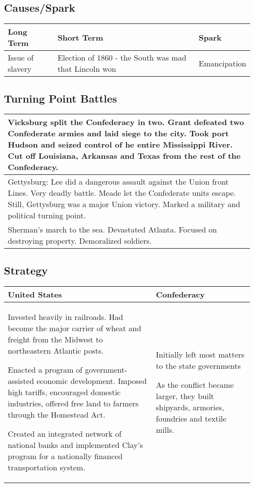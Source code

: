 \documentclass{article}
\begin{document}
\subsection{Causes/Spark}
\begin{tabular}{|p{4cm}|p{4cm}|p{4cm}|}
    \hline
    Long Term & Short Term & Spark \\
    \hline
    Issue of slavery
    &
    Election of 1860 - the South was mad that Lincoln won
    &
    Emancipation
    \\
    \hline
\end{tabular}

\subsection{Turning Point Battles}
\begin{tabular}{|p{14cm}|}
    \hline
    Vicksburg split the Confederacy in two. Grant defeated two Confederate
    armies and laid siege to the city. Took port Hudson and seized control of
    he entire Mississippi River. Cut off Louisiana, Arkansas and Texas from
    the rest of the Confederacy.
    \\
    \hline
    Gettysburg: Lee did a dangerous assault against the Union front Lines. Very
    deadly battle. Meade let the Confederate units escape. Still, Gettysburg
    was a major Union victory. Marked a military and political turning point.
    \\
    \hline
    Sherman's march to the sea. Devastated Atlanta. Focused on destroying
    property. Demoralized soldiers.
    \\
    \hline
\end{tabular}

\subsection{Strategy}
\begin{tabular}{|p{7cm}|p{7cm}|}
    \hline
    United States & Confederacy \\
    \hline
    Invested heavily in railroads. Had become the major carrier of wheat and
    freight from the Midwest to northeastern Atlantic posts.
    
    Enacted a program of government-assisted economic development. Imposed high
    tariffs, encouraged domestic industries, offered free land to farmers
    through the Homestead Act.

    Created an integrated network of national banks and implemented Clay's
    program for a nationally financed transportation system.
    &
    Initially left most matters to the state governments

    As the conflict became larger, they built shipyards, armories, foundries
    and textile mills.
    \\
    \hline
\end{tabular}
\end{document}
